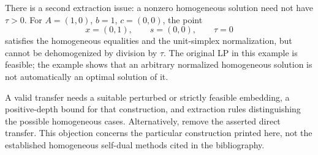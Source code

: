 \documentclass[10pt]{article}
\begin{document}
There is a second extraction issue: a nonzero homogeneous solution need not have \(\tau>0\). For \(A=(1,0)\), \(b=1\), \(c=(0,0)\), the point \[x=(0,1),\qquad s=(0,0),\qquad \tau=0\] satisfies the homogeneous equalities and the unit-simplex normalization, but cannot be dehomogenized by division by \(\tau\). The original LP in this example is feasible; the example shows that an arbitrary normalized homogeneous solution is not automatically an optimal solution of it.\par
A valid transfer needs a suitable perturbed or strictly feasible embedding, a positive-depth bound for that construction, and extraction rules distinguishing the possible homogeneous cases. Alternatively, remove the asserted direct transfer. This objection concerns the particular construction printed here, not the established homogeneous self-dual methods cited in the bibliography.\par
\end{document}
